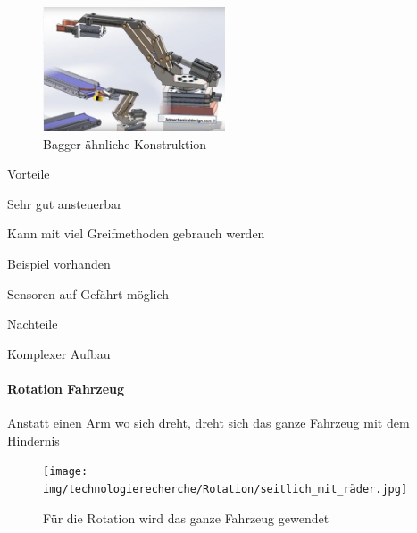 \documentclass[../main.tex]{subfiles}
\begin{document}
\begin{figure}[h!]
        \centering
        \includegraphics[width=0.48\textwidth]{img/technologierecherche/Rotation/kran.jpg}
        \caption[Bagger änhliche Konstruktion]{Bagger ähnliche Konstruktion \footnotemark} 
        \label{img:tech_kran}
\end{figure}

\begin{minipage}[t]{0.48\textwidth}
    \begin{items}
          \item [Vorteile]
          \item Sehr gut ansteuerbar
          \item Kann mit viel Greifmethoden gebrauch werden
          \item Beispiel vorhanden
          \item Sensoren auf Gefährt möglich
    \end{items}
\end{minipage}
\hfill
\begin{minipage}[t]{0.48\textwidth}
    \begin{items}
          \item [Nachteile]
          \item Komplexer Aufbau
    \end{items}
\end{minipage}
\newpage
\paragraph{Rotation Fahrzeug}
Anstatt einen Arm wo sich dreht, dreht sich das ganze Fahrzeug mit dem Hindernis

\begin{figure}[h!]
        \centering
        \texttt{[image: img/technologierecherche/Rotation/seitlich\_mit\_räder.jpg]}
        \caption{Für die Rotation wird das ganze Fahrzeug gewendet}
        \label{img:tech_seitlich_mit_räder}
\end{figure}
\end{document}
